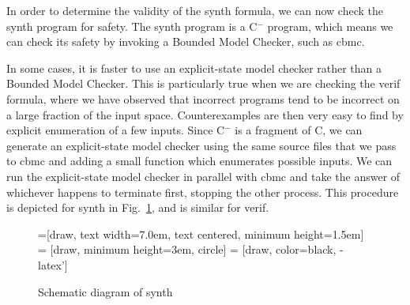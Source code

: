 \documentclass[a4paper]{llncs}
\newcommand{\newC}{C$^-$\xspace}
\begin{document}
In order to determine the validity of the {\sc synth} formula, we can now
check the {\sc synth} program for safety.  The {\sc synth} program is a
\newC program, which means we can check its safety by invoking a Bounded
Model Checker, such as {\sc cbmc}.

In some cases, it is faster to use an explicit-state model checker rather
than a Bounded Model Checker.  This is particularly true when we are checking
the {\sc verif} formula, where we have observed that incorrect programs tend
to be incorrect on a large fraction of the input space.  Counterexamples
are then very easy to find by explicit enumeration of a few inputs.
Since \newC is a fragment of C, we can generate an explicit-state
model checker using the same source files that we pass to {\sc cbmc}
and adding a small function which enumerates possible inputs.
We can run the explicit-state model checker
in parallel with {\sc cbmc} and take the answer of whichever happens
to terminate first, stopping the other process.  This procedure is
depicted for {\sc synth} in Fig.~\ref{fig:synth-dfd}, and is similar for {\sc verif}.

\begin{figure}
\begin{center}
=[draw, text width=7.0em, text centered,
  minimum height=1.5em]
 = [draw, minimum height=3em, circle]
 = [draw, color=black, -latex']


\end{center}

\caption{Schematic diagram of {\sc synth}}
\label{fig:synth-dfd}
\end{figure}
\end{document}
